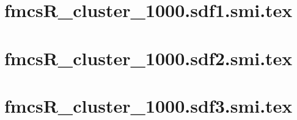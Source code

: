 
\section{fmcsR_cluster_1000.sdf1.smi.tex}

\section{fmcsR_cluster_1000.sdf2.smi.tex}

\section{fmcsR_cluster_1000.sdf3.smi.tex}
